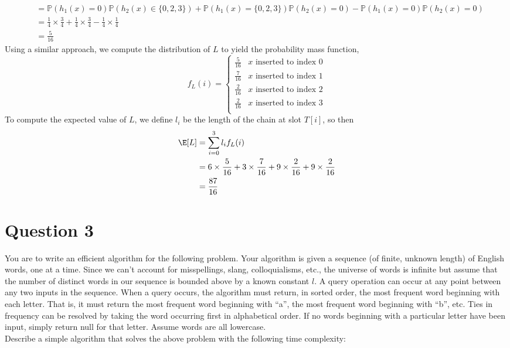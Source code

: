 \documentclass[11pt]{article}
\begin{document}
\begin{enumerate}
\begin{solution}
\begin{align*}
      &= \mathbb{P}(h_1(x) = 0) \mathbb{P}(h_2(x) \in \{0, 2, 3\}) + \mathbb{P}(h_1(x) = \{0, 2, 3\})\mathbb{P}(h_2(x) = 0) - \mathbb{P}(h_1(x) = 0)\mathbb{P}(h_2(x) = 0) \tag{by independence of $h_1$ and $h_2$}\\
      &= \frac{1}{4}\times \frac{3}{4} + \frac{1}{4} \times \frac{3}{4} - \frac{1}{4}\times \frac{1}{4}\\
      &= \frac{5}{16}
    \end{align*}
    Using a similar approach, we compute the distribution of $L$ to yield the probability mass function,
    \[
      f_{L}(i) =
      \begin{cases*}
        \frac{5}{16} & \text{$x$ inserted to index 0}\\
        \frac{7}{16} & \text{$x$ inserted to index 1}\\
        \frac{2}{16} & \text{$x$ inserted to index 2}\\
        \frac{2}{16} & \text{$x$ inserted to index 3}\\
      \end{cases*}
    \]
    To compute the expected value of $L$, we define $l_i$ be the length of the chain at slot $T[i]$, so then
    \begin{align*}
      \E[L] &= \sum_{i=0}^3 l_i f_L(i)\\
      &= 6\times \frac{5}{16} + 3 \times \frac{7}{16} + 9 \times \frac{2}{16} + 9 \times \frac{2}{16}\\
      &= \frac{87}{16}
    \end{align*}

  \end{solution}
\end{enumerate}




\section*{Question 3}

You are to write an efficient algorithm for the following problem. Your algorithm is given a sequence (of finite, unknown length) of English words, one at a time. Since we can’t account for misspellings, slang, colloquialisms, etc., the universe of words is infinite but assume that the number of distinct words in our sequence is bounded above by a known constant $l$. A query operation can occur at any point between any two inputs in the sequence. When a query occurs, the algorithm must return, in sorted order, the most frequent word beginning with each letter. That is, it must return the most frequent word beginning with “a”, the most frequent word beginning with “b”, etc. Ties in frequency can be resolved by taking the word occurring first in alphabetical order. If no words beginning with a particular letter have been input, simply return null for that letter. Assume words are all lowercase.\\
Describe a simple algorithm that solves the above problem with the following time complexity:
\end{document}
